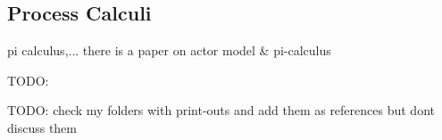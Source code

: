 \subsection{Process Calculi}
pi calculus,...
there is a paper on actor model \& pi-calculus

TODO: \cite{padget_pi-calculus_1998}

TODO: check my folders with print-outs and add them as references but dont discuss them